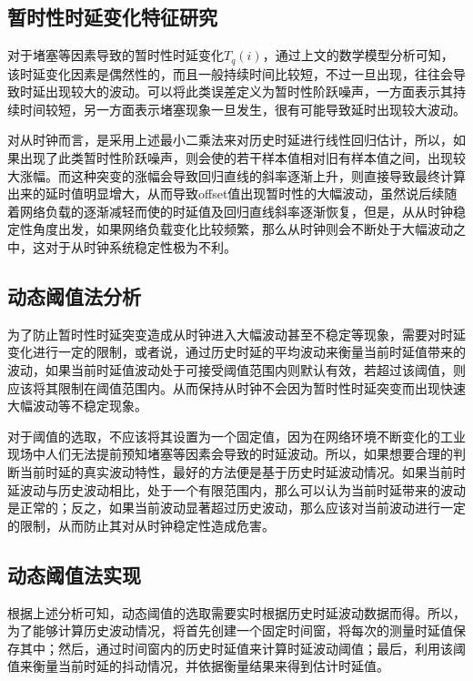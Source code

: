 \subsection{暂时性时延变化特征研究}
对于堵塞等因素导致的暂时性时延变化$T_{q}(i)$，通过上文的数学模型分析可知，该时延变化因素是偶然性的，而且一般持续时间比较短，不过一旦出现，往往会导致时延出现较大的波动。可以将此类误差定义为暂时性阶跃噪声，一方面表示其持续时间较短，另一方面表示堵塞现象一旦发生，很有可能导致延时出现较大波动。

对从时钟而言，是采用上述最小二乘法来对历史时延进行线性回归估计，所以，如果出现了此类暂时性阶跃噪声，则会使的若干样本值相对旧有样本值之间，出现较大涨幅。而这种突变的涨幅会导致回归直线的斜率逐渐上升，则直接导致最终计算出来的延时值明显增大，从而导致offset值出现暂时性的大幅波动，虽然说后续随着网络负载的逐渐减轻而使的时延值及回归直线斜率逐渐恢复，但是，从从时钟稳定性角度出发，如果网络负载变化比较频繁，那么从时钟则会不断处于大幅波动之中，这对于从时钟系统稳定性极为不利。

\subsection{动态阈值法分析}
为了防止暂时性时延突变造成从时钟进入大幅波动甚至不稳定等现象，需要对时延变化进行一定的限制，或者说，通过历史时延的平均波动来衡量当前时延值带来的波动，如果当前时延值波动处于可接受阈值范围内则默认有效，若超过该阈值，则应该将其限制在阈值范围内。从而保持从时钟不会因为暂时性时延突变而出现快速大幅波动等不稳定现象。

对于阈值的选取，不应该将其设置为一个固定值，因为在网络环境不断变化的工业现场中人们无法提前预知堵塞等因素会导致的时延波动。所以，如果想要合理的判断当前时延的真实波动特性，最好的方法便是基于历史时延波动情况。如果当前时延波动与历史波动相比，处于一个有限范围内，那么可以认为当前时延带来的波动是正常的；反之，如果当前波动显著超过历史波动，那么应该对当前波动进行一定的限制，从而防止其对从时钟稳定性造成危害。

\subsection{动态阈值法实现}
根据上述分析可知，动态阈值的选取需要实时根据历史时延波动数据而得。所以，为了能够计算历史波动情况，将首先创建一个固定时间窗，将每次的测量时延值保存其中；然后，通过时间窗内的历史时延值来计算时延波动阈值；最后，利用该阈值来衡量当前时延的抖动情况，并依据衡量结果来得到估计时延值。

